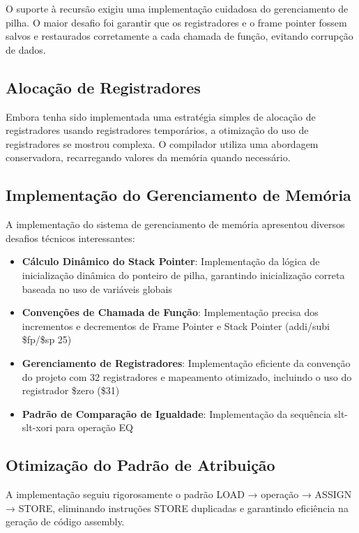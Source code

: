 \documentclass[
	12pt,				%
	oneside,
	a4paper,			%
	english,			%
	french,				%
	spanish,			%
	brazil,				%
	]{abntex2}
\begin{document}
O suporte à recursão exigiu uma implementação cuidadosa do gerenciamento de pilha. O maior desafio foi garantir que os registradores e o frame pointer fossem salvos e restaurados corretamente a cada chamada de função, evitando corrupção de dados.

\subsection{Alocação de Registradores}

Embora tenha sido implementada uma estratégia simples de alocação de registradores usando registradores temporários, a otimização do uso de registradores se mostrou complexa. O compilador utiliza uma abordagem conservadora, recarregando valores da memória quando necessário.

\subsection{Implementação do Gerenciamento de Memória}

A implementação do sistema de gerenciamento de memória apresentou diversos desafios técnicos interessantes:

\begin{itemize}
    \item \textbf{Cálculo Dinâmico do Stack Pointer}: Implementação da lógica de inicialização dinâmica do ponteiro de pilha, garantindo inicialização correta baseada no uso de variáveis globais
    \item \textbf{Convenções de Chamada de Função}: Implementação precisa dos incrementos e decrementos de Frame Pointer e Stack Pointer (addi/subi \$fp/\$sp 25)
    \item \textbf{Gerenciamento de Registradores}: Implementação eficiente da convenção do projeto com 32 registradores e mapeamento otimizado, incluindo o uso do registrador \$zero (\$31)
    \item \textbf{Padrão de Comparação de Igualdade}: Implementação da sequência slt-slt-xori para operação EQ
\end{itemize}

\subsection{Otimização do Padrão de Atribuição}

A implementação seguiu rigorosamente o padrão LOAD → operação → ASSIGN → STORE, eliminando instruções STORE duplicadas e garantindo eficiência na geração de código assembly.
\end{document}
